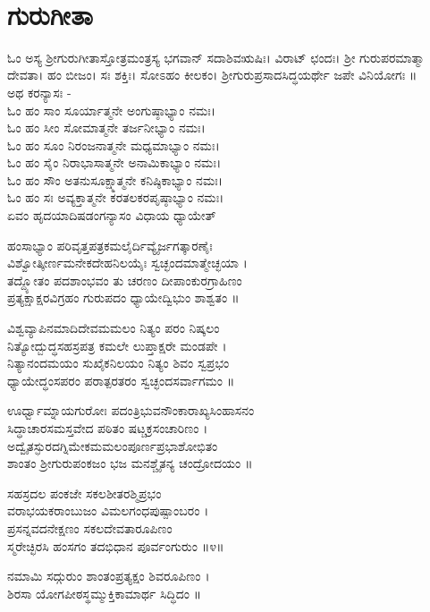 ‌\chapter*{\center ಗುರುಗೀತಾ}
ಓಂ ಅಸ್ಯ ಶ್ರೀಗುರುಗೀತಾಸ್ತೋತ್ರಮಂತ್ರಸ್ಯ ಭಗವಾನ್ ಸದಾಶಿವಋಷಿಃ। ವಿರಾಟ್ ಛಂದಃ। ಶ್ರೀ ಗುರುಪರಮಾತ್ಮಾ ದೇವತಾ। ಹಂ ಬೀಜಂ। ಸಃ ಶಕ್ತಿಃ। ಸೋಽಹಂ ಕೀಲಕಂ। ಶ್ರೀಗುರುಪ್ರಸಾದಸಿದ್ಧಯರ್ಥೇ ಜಪೇ ವಿನಿಯೋಗಃ ॥\\

ಅಥ ಕರನ್ಯಾಸಃ -\\
ಓಂ ಹಂ ಸಾಂ ಸೂರ್ಯಾತ್ಮನೇ ಅಂಗುಷ್ಠಾಭ್ಯಾಂ ನಮಃ।\\
ಓಂ ಹಂ ಸೀಂ ಸೋಮಾತ್ಮನೇ ತರ್ಜನೀಭ್ಯಾಂ ನಮಃ।\\
ಓಂ ಹಂ ಸೂಂ ನಿರಂಜನಾತ್ಮನೇ ಮಧ್ಯಮಾಭ್ಯಾಂ ನಮಃ।\\
ಓಂ ಹಂ ಸೈಂ ನಿರಾಭಾಸಾತ್ಮನೇ ಅನಾಮಿಕಾಭ್ಯಾಂ ನಮಃ।\\
ಓಂ ಹಂ ಸೌಂ ಅತನುಸೂಕ್ಷ್ಮಾತ್ಮನೇ ಕನಿಷ್ಠಿಕಾಭ್ಯಾಂ ನಮಃ।\\
ಓಂ ಹಂ ಸಃ ಅವ್ಯಕ್ತಾತ್ಮನೇ ಕರತಲಕರಪೃಷ್ಠಾಭ್ಯಾಂ ನಮಃ।\\
ಏವಂ ಹೃದಯಾದಿಷಡಂಗನ್ಯಾಸಂ ವಿಧಾಯ ಧ್ಯಾಯೇತ್\-

ಹಂಸಾಭ್ಯಾಂ ಪರಿವೃತ್ತಪತ್ರಕಮಲೈರ್ದಿವ್ಯೈರ್ಜಗತ್ಕಾರಣೈಃ\\
ವಿಶ್ವೋತ್ಕೀರ್ಣಮನೇಕದೇಹನಿಲಯೈಃ ಸ್ವಚ್ಛಂದಮಾತ್ಮೇಚ್ಛಯಾ ।\\
ತದ್ದ್ಯೋತಂ ಪದಶಾಂಭವಂ ತು ಚರಣಂ ದೀಪಾಂಕುರಗ್ರಾಹಿಣಂ\\
ಪ್ರತ್ಯಕ್ಷಾಕ್ಷರವಿಗ್ರಹಂ ಗುರುಪದಂ ಧ್ಯಾಯೇದ್ವಿಭುಂ ಶಾಶ್ವತಂ ॥

ವಿಶ್ವವ್ಯಾಪಿನಮಾದಿದೇವಮಮಲಂ ನಿತ್ಯಂ ಪರಂ ನಿಷ್ಕಲಂ\\
ನಿತ್ಯೋದ್ಬುದ್ಧಸಹಸ್ರಪತ್ರ ಕಮಲೇ ಲುಪ್ತಾಕ್ಷರೇ ಮಂಡಪೇ ।\\
ನಿತ್ಯಾನಂದಮಯಂ ಸುಖೈಕನಿಲಯಂ ನಿತ್ಯಂ ಶಿವಂ ಸ್ವಪ್ರಭಂ\\
ಧ್ಯಾಯೇದ್ಧಂಸಪರಂ ಪರಾತ್ಪರತರಂ ಸ್ವಚ್ಛಂದಸರ್ವಾಗಮಂ ॥

ಊರ್ಧ್ವಾಮ್ನಾಯಗುರೋಃ ಪದಂತ್ರಿಭುವನೌಂಕಾರಾಖ್ಯಸಿಂಹಾಸನಂ\\
ಸಿದ್ಧಾಚಾರಸಮಸ್ತವೇದ ಪಠಿತಂ ಷಟ್ಚಕ್ರಸಂಚಾರಿಣಂ ।\\
ಅದ್ವೈತಸ್ಫುರದಗ್ನಿಮೇಕಮಮಲಂಪೂರ್ಣಪ್ರಭಾಶೋಭಿತಂ\\
ಶಾಂತಂ ಶ್ರೀಗುರುಪಂಕಜಂ ಭಜ ಮನಶ್ಚೈತನ್ಯ ಚಂದ್ರೋದಯಂ ॥

ಸಹಸ್ರದಲ ಪಂಕಜೇ ಸಕಲಶೀತರಶ್ಮಿಪ್ರಭಂ\\
ವರಾಭಯಕರಾಂಬುಜಂ ವಿಮಲಗಂಧಪುಷ್ಪಾಂಬರಂ ।\\
ಪ್ರಸನ್ನವದನೇಕ್ಷಣಂ ಸಕಲದೇವತಾರೂಪಿಣಂ\\
ಸ್ಮರೇಚ್ಛಿರಸಿ ಹಂಸಗಂ ತದಭಿಧಾನ ಪೂರ್ವಂಗುರುಂ ॥೪॥

ನಮಾಮಿ ಸದ್ಗುರುಂ ಶಾಂತಂಪ್ರತ್ಯಕ್ಷಂ ಶಿವರೂಪಿಣಂ ।\\
ಶಿರಸಾ ಯೋಗಪೀಠಸ್ಥಮ್ಮುಕ್ತಿಕಾಮಾರ್ಥ ಸಿದ್ಧಿದಂ ॥

